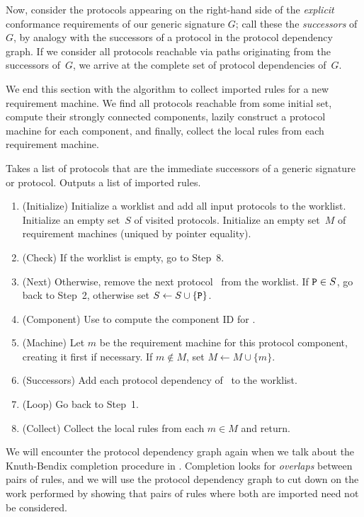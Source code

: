 \documentclass[../generics]{subfiles}
\begin{document}
Now, consider the protocols appearing on the right-hand side of the \emph{explicit} conformance requirements of our generic signature $G$; call these the \emph{successors} of $G$, by analogy with the successors of a protocol in the protocol dependency graph. If we consider all protocols reachable via paths originating from the successors of~$G$, we arrive at the complete set of protocol dependencies of~$G$.

We end this section with the algorithm to collect imported rules for a new requirement machine. We find all protocols reachable from some initial set, compute their strongly connected components, lazily construct a protocol machine for each component, and finally, collect the local rules from each requirement machine.
\begin{algorithm}\label{importing rules}
Takes a list of protocols that are the immediate successors of a generic signature or protocol. Outputs a list of imported rules.
\begin{enumerate}
\item (Initialize) Initialize a worklist and add all input protocols to the worklist. Initialize an empty set~$S$ of visited protocols. Initialize an empty set~$M$ of requirement machines (uniqued by pointer equality).
\item (Check) If the worklist is empty, go to Step~8.
\item (Next) Otherwise, remove the next protocol \tP\ from the worklist. If $\texttt{P}\in S$, go back to Step~2, otherwise set $S\leftarrow S\cup\{\texttt{P}\}$.
\item (Component) Use  to compute the component ID for \tP.
\item (Machine) Let $m$ be the requirement machine for this protocol component, creating it first if necessary. If $m\notin M$, set $M\leftarrow M\cup\{m\}$.
\item (Successors) Add each protocol dependency of \tP\ to the worklist.
\item (Loop) Go back to Step~1.
\item (Collect) Collect the local rules from each $m\in M$ and return.
\end{enumerate}
\end{algorithm}

We will encounter the protocol dependency graph again when we talk about the Knuth-Bendix completion procedure in . Completion looks for \emph{overlaps} between pairs of rules, and we will use the protocol dependency graph to cut down on the work performed by showing that pairs of rules where both are imported need not be considered.
\end{document}
